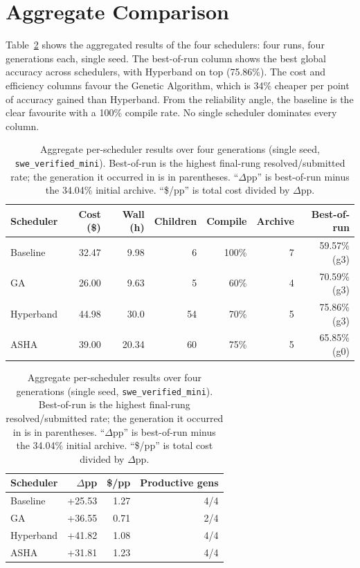 \section{Aggregate Comparison}
\label{sec:results-summary}

Table~\ref{tab:results-aggregate} shows the aggregated results of the
four schedulers: four runs, four generations each, single seed. The
best-of-run column shows the best global accuracy across schedulers,
with Hyperband on top (75.86\%). The cost and efficiency columns
favour the Genetic Algorithm, which is 34\% cheaper per point of
accuracy gained than Hyperband. From the reliability angle, the
baseline is the clear favourite with a 100\% compile rate. No single
scheduler dominates every column.

\begin{table}[ht]
\centering
\caption{Aggregate per-scheduler results over four generations
(single seed, \texttt{swe\_verified\_mini}). Best-of-run is the highest
final-rung resolved/submitted rate; the generation it occurred in is in
parentheses. ``$\Delta$pp'' is best-of-run minus the 34.04\% initial
archive. ``\$/pp'' is total cost divided by $\Delta$pp.}
\label{tab:results-aggregate}
\setlength{\tabcolsep}{4pt}
\begin{tabular}{lrrrrrr}
\hline
Scheduler & Cost (\$) & Wall (h) & Children & Compile & Archive
 & Best-of-run \\
\hline
Baseline  & 32.47 & 9.98  &  6 & 100\% & 7 & 59.57\% (g3) \\
GA        & 26.00 & 9.63  &  5 &  60\% & 4 & 70.59\% (g3) \\
Hyperband & 44.98 & 30.0  & 54 &  70\% & 5 & 75.86\% (g3) \\
ASHA      & 39.00 & 20.34 & 60 &  75\% & 5 & 65.85\% (g0) \\
\hline
\end{tabular}

\vspace{1ex}

\begin{tabular}{lrrr}
\hline
Scheduler & $\Delta$pp & \$/pp & Productive gens \\
\hline
Baseline  & +25.53 & 1.27 & 4/4 \\
GA        & +36.55 & 0.71 & 2/4 \\
Hyperband & +41.82 & 1.08 & 4/4 \\
ASHA      & +31.81 & 1.23 & 4/4 \\
\hline
\end{tabular}
\end{table}

